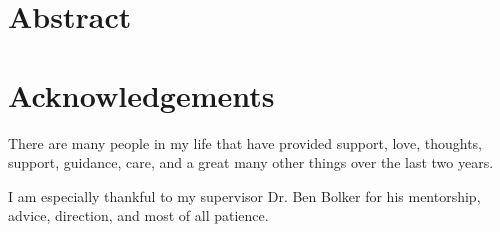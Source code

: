 \documentclass[12pt]{report}
\makeatletter
\let\org@subfile
\renewcommand*{}[1]{%
  \filename@parse{#1}%
  \expandafter
  \graphicspath\expandafter{\expandafter{\filename@area}}%
  \org@subfile{#1}%
}
\makeatother
\begin{document}
	


	

	\setcounter{page}{1}


	


	\chapter*{Abstract}

		\lipsum[1]

	\chapter*{Acknowledgements}

		There are many people in my life that have provided support, love, thoughts, support, guidance, care, and a great many other things over the last two years.

		I am especially thankful to my supervisor Dr. Ben Bolker for his mentorship, advice, direction, and most of all patience.

	\tableofcontents

	\listoffigures


	\newpage
	
\end{document}
